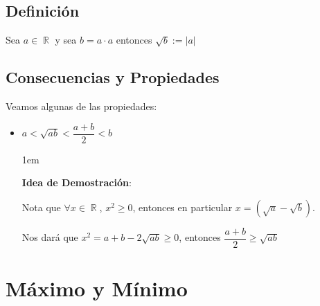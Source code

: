 \documentclass[12pt, fleqn]{report}                             %
\newenvironment{SmallIndentation}[1][0.75em]                    %
        {\begin{adjustwidth}{#1}{}\begin{footnotesize}}             %
        {\end{footnotesize}\end{adjustwidth}}                       %
\theoremstyle{break}                                            %
\DeclareMathOperator \Reals        {\mathbb{R}}                 %
\begin{document}
            \subsection{Definición}

                Sea $a \in \Reals$ y sea $b = a \cdot a$ entonces
                $\sqrt{b} := |a|$

            \vspace{1em}
            \subsection{Consecuencias y Propiedades}

                Veamos algunas de las propiedades:

                \begin{itemize}

                    \item $a < \sqrt{ab} < \dfrac{a+b}{2} < b$

                        \begin{SmallIndentation}[1em]
                            \textbf{Idea de Demostración}:
                            
                            Nota que $\forall x \in \Reals$, $x^2 \geq 0$, entonces
                            en particular $x = (\sqrt{a} - \sqrt{b})$.

                            Nos dará que $x^2 = a + b -2\sqrt{ab} \geq 0$, entonces
                            $\dfrac{a + b}{2} \geq \sqrt{ab}$
                        
                        \end{SmallIndentation}

                \end{itemize}



        \clearpage
        \section{Máximo y Mínimo}
\end{document}

